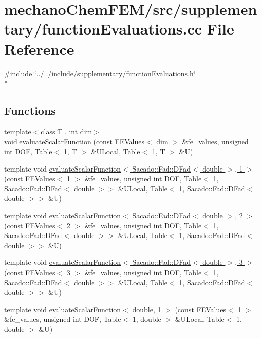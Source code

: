 \section{mechano\-Chem\-F\-E\-M/src/supplementary/function\-Evaluations.cc File Reference}
\label{function_evaluations_8cc}
{\ttfamily \#include \char`\"{}../../include/supplementary/function\-Evaluations.\-h\char`\"{}}\\*
\subsection*{Functions}
\begin{DoxyCompactItemize}
\item 
{\footnotesize template$<$class T , int dim$>$ }\\void \hyperlink{group___evaluation_functions_ga399ae2353249293211c021848a64175c}{evaluate\-Scalar\-Function} (const F\-E\-Values$<$ dim $>$ \&fe\-\_\-values, unsigned int D\-O\-F, Table$<$ 1, T $>$ \&U\-Local, Table$<$ 1, T $>$ \&U)
\item 
template void \hyperlink{function_evaluations_8cc_a6856c1b1b83231bc778cecda3950533d}{evaluate\-Scalar\-Function$<$ Sacado\-::\-Fad\-::\-D\-Fad$<$ double $>$, 1 $>$} (const F\-E\-Values$<$ 1 $>$ \&fe\-\_\-values, unsigned int D\-O\-F, Table$<$ 1, Sacado\-::\-Fad\-::\-D\-Fad$<$ double $>$$>$ \&U\-Local, Table$<$ 1, Sacado\-::\-Fad\-::\-D\-Fad$<$ double $>$$>$ \&U)
\item 
template void \hyperlink{function_evaluations_8cc_af8ed01aa7f3c36625c149e3600d96714}{evaluate\-Scalar\-Function$<$ Sacado\-::\-Fad\-::\-D\-Fad$<$ double $>$, 2 $>$} (const F\-E\-Values$<$ 2 $>$ \&fe\-\_\-values, unsigned int D\-O\-F, Table$<$ 1, Sacado\-::\-Fad\-::\-D\-Fad$<$ double $>$$>$ \&U\-Local, Table$<$ 1, Sacado\-::\-Fad\-::\-D\-Fad$<$ double $>$$>$ \&U)
\item 
template void \hyperlink{function_evaluations_8cc_a57853d187be6c5f0a186e6ba62f141d6}{evaluate\-Scalar\-Function$<$ Sacado\-::\-Fad\-::\-D\-Fad$<$ double $>$, 3 $>$} (const F\-E\-Values$<$ 3 $>$ \&fe\-\_\-values, unsigned int D\-O\-F, Table$<$ 1, Sacado\-::\-Fad\-::\-D\-Fad$<$ double $>$$>$ \&U\-Local, Table$<$ 1, Sacado\-::\-Fad\-::\-D\-Fad$<$ double $>$$>$ \&U)
\item 
template void \hyperlink{function_evaluations_8cc_a436a979f117d9baba72821197a739e19}{evaluate\-Scalar\-Function$<$ double, 1 $>$} (const F\-E\-Values$<$ 1 $>$ \&fe\-\_\-values, unsigned int D\-O\-F, Table$<$ 1, double $>$ \&U\-Local, Table$<$ 1, double $>$ \&U)

\end{DoxyCompactItemize}
